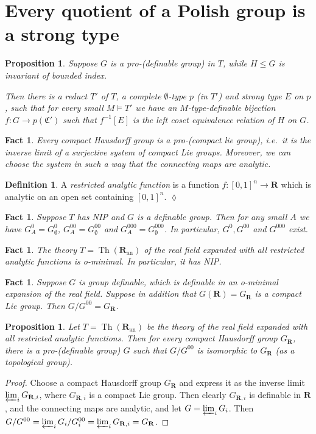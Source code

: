 \documentclass[final,a4paper,12pt]{amsart}
\newcommand{\fC}{{\mathfrak C}}
\newcommand{\bR}{{\mathbf{R}}}
\newcommand{\an}{\mathrm{an}}
\DeclareMathOperator{\Th}{{Th}}
\newtheorem{fct}[thm]{Fact}
\newtheorem{prop}[thm]{Proposition}
\theoremstyle{remark}
\theoremstyle{definition}
\newtheorem{dfn}[thm]{Definition}
\newcommand{\xqed}[1]{%
	\leavevmode\unskip\penalty9999 \hbox{}\nobreak\hfill
	\quad\hbox{\ensuremath{#1}}}
\begin{document}
	\section{Every quotient of a Polish group is a strong type}
	\begin{prop}
		Suppose $G$ is a pro-(definable group) in $T$, while $H\leq G$ is invariant of bounded index.
		
		Then there is a reduct $T'$ of $T$, a complete $\emptyset$-type $p$ (in $T'$) and strong type $E$ on $p$, such that for every small $M\models T'$ we have an $M$-type-definable bijection $f\colon G\to p(\fC')$ such that $f^{-1}[E]$ is the left coset equivalence relation of $H$ on $G$.
	\end{prop}
	
	\begin{fct}
		Every compact Hausdorff group is a pro-(compact lie group), i.e.\ it is the inverse limit of a surjective system of compact Lie groups. Moreover, we can choose the system in such a way that the connecting maps are analytic.
	\end{fct}
	
	\begin{dfn}
		A \emph{restricted analytic function} is a function $f\colon [0,1]^n\to \bR$ which is analytic on an open set containing $[0,1]^n$.\xqed{\lozenge}
	\end{dfn}
	
	\begin{fct}
		Suppose $T$ has NIP and $G$ is a definable group. Then for any small $A$ we have $G^{0}_A=G^{0}_\emptyset$, $G^{00}_A=G^{00}_\emptyset$ and $G^{000}_A=G^{000}_\emptyset$. In particular, $G^0, G^{00}$ and $G^{000}$ exist.
	\end{fct}
	
		
	\begin{fct}
		The theory $T=\Th(\bR_{\an})$ of the real field expanded with all restricted analytic functions is o-minimal. In particular, it has NIP.
	\end{fct}

	\begin{fct}
		Suppose $G$ is group definable, which is definable in an o-minimal expansion of the real field. Suppose in addition that $G(\bR)=G_\bR$ is a compact Lie group. Then $G/G^{00}=G_{\bR}$.
	\end{fct}
	
	\begin{prop}
		Let $T=\Th(\bR_{\an})$ be the theory of the real field expanded with all restricted analytic functions. Then for every compact Hausdorff group $G_{\bR}$, there is a pro-(definable group) $G$ such that $G/G^{00}$ is isomorphic to $G_{\bR}$ (as a topological group).
	\end{prop}
	\begin{proof}
		Choose a compact Hausdorff group $G_{\bR}$ and express it as the inverse limit $\varprojlim_i G_{\bR,i}$, where $G_{\bR,i}$ is a compact Lie group. Then clearly $G_{\bR,i}$ is definable in $\bR$, and the connecting maps are analytic, and let $G=\varprojlim_i G_i$. Then $G/G^{00}=\varprojlim_i G_i/G_i^{00}=\varprojlim_i G_{\bR,i}=G_{\bR}$.
	\end{proof}
\end{document}
